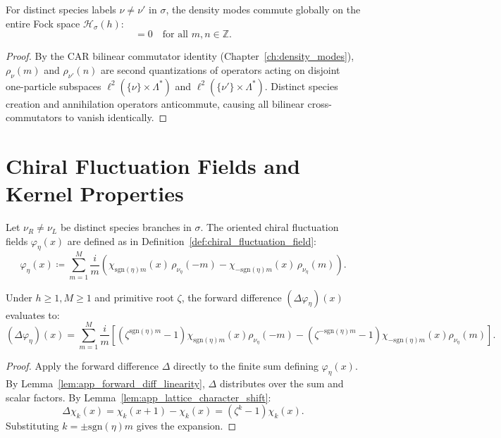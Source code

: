 \begin{lemma}
\label{lem:app_chiral_cross_commute}
For distinct species labels $\nu \neq \nu'$ in $\sigma$, the density modes commute globally on the entire Fock space $\mathcal{H}_\sigma(h)$:
\begin{equation}
[\rho_\nu(m), \rho_{\nu'}(n)] = 0 \quad \text{for all } m, n \in \mathbb{Z}.
\end{equation}
\end{lemma}

\begin{proof}
By the CAR bilinear commutator identity (Chapter~\ref{ch:density_modes}), $\rho_\nu(m)$ and $\rho_{\nu'}(n)$ are second quantizations of operators acting on disjoint one-particle subspaces $\ell^2(\{\nu\} \times \Lambda^*)$ and $\ell^2(\{\nu'\} \times \Lambda^*)$. Distinct species creation and annihilation operators anticommute, causing all bilinear cross-commutators to vanish identically.
\end{proof}

\section{Chiral Fluctuation Fields and Kernel Properties}

Let $\nu_R \neq \nu_L$ be distinct species branches in $\sigma$. The oriented chiral fluctuation fields $\varphi_\eta(x)$ are defined as in Definition~\ref{def:chiral_fluctuation_field}:
\begin{equation}
\varphi_\eta(x) \coloneqq \sum_{m=1}^M \frac{i}{m} \left( \chi_{\mathrm{sgn}(\eta) m}(x)\, \rho_{\nu_\eta}(-m) - \chi_{-\mathrm{sgn}(\eta) m}(x)\, \rho_{\nu_\eta}(m) \right).
\end{equation}

\begin{lemma}
\label{lem:app_chiral_forward_diff}
Under $h \ge 1, M \ge 1$ and primitive root $\zeta$, the forward difference $(\Delta \varphi_\eta)(x)$ evaluates to:
\begin{equation}
(\Delta \varphi_\eta)(x) = \sum_{m=1}^M \frac{i}{m} \left[ (\zeta^{\mathrm{sgn}(\eta) m} - 1) \chi_{\mathrm{sgn}(\eta) m}(x) \rho_{\nu_\eta}(-m) - (\zeta^{-\mathrm{sgn}(\eta) m} - 1) \chi_{-\mathrm{sgn}(\eta) m}(x) \rho_{\nu_\eta}(m) \right].
\end{equation}
\end{lemma}

\begin{proof}
Apply the forward difference $\Delta$ directly to the finite sum defining $\varphi_\eta(x)$. By Lemma~\ref{lem:app_forward_diff_linearity}, $\Delta$ distributes over the sum and scalar factors. By Lemma~\ref{lem:app_lattice_character_shift}:
\[
\Delta \chi_k(x) = \chi_k(x+1) - \chi_k(x) = (\zeta^k - 1) \chi_k(x).
\]
Substituting $k = \pm \mathrm{sgn}(\eta) m$ gives the expansion.
\end{proof}

